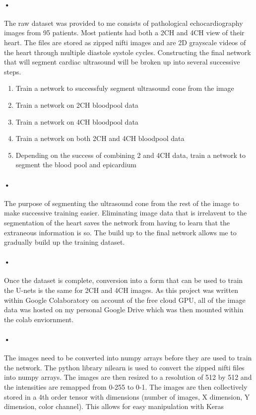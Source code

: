 \documentclass{article}
\begin{document}
\paragraph{•}
The raw dataset was provided to me consists of pathological echocardiography images from 95 patients. 
Most patients had both a 2CH and 4CH view of their heart. The files are stored as zipped nifti images and are 2D grayscale videos of the heart through multiple diastole systole cycles.
Constructing the final network that will segment cardiac ultrasound will be broken up into several successive steps.

\begin{enumerate}
\item Train a network to successfuly segment ultrasound cone from the image
\item Train a network on 2CH bloodpool data
\item Train a network on 4CH bloodpool data
\item Train a network on both 2CH and 4CH bloodpool data
\item Depending on the success of combining 2 and 4CH data, train a network to segment the blood pool and epicardium

\end{enumerate}
\paragraph{•}
The purpose of segmenting the ultrasound cone from the rest of the image to make successive training easier.
Eliminating image data that is irrelavent to the segmentation of the heart saves the network from having to learn that the extraneous information is so. The build up to the final network allows me to gradually build up the training dataset.


\paragraph{•}
Once the dataset is complete, conversion into a form that can be used to train the U-nets is the same for 2CH and 4CH images. As this project was written within Google Colaboratory on account of the free cloud GPU, all of the image data was hosted on my personal Google Drive which was then mounted within the colab enviornment. 
\paragraph{•}
The images need to be converted into numpy arrays before they are used to train the network. The python library nilearn is used to convert the zipped nifti files into numpy arrays. The images are then resized to a resolution of 512 by 512 and the intensities are remapped from 0-255 to 0-1. The images are then collectively stored in a 4th order tensor with dimensions (number of images, X dimension, Y dimension, color channel). This allows for easy manipulation with Keras
\end{document}
